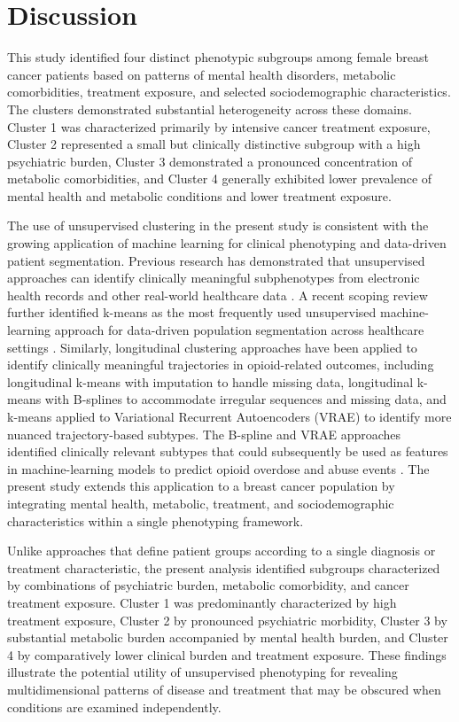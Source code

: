 \documentclass[11pt]{article}
\begin{document}
\section{Discussion}
This study identified four distinct phenotypic subgroups among female breast cancer patients based on patterns of mental health disorders, metabolic comorbidities, treatment exposure, and selected sociodemographic characteristics. The clusters demonstrated substantial heterogeneity across these domains. Cluster 1 was characterized primarily by intensive cancer treatment exposure, Cluster 2 represented a small but clinically distinctive subgroup with a high psychiatric burden, Cluster 3 demonstrated a pronounced concentration of metabolic comorbidities, and Cluster 4 generally exhibited lower prevalence of mental health and metabolic conditions and lower treatment exposure.

The use of unsupervised clustering in the present study is consistent with the growing application of machine learning for clinical phenotyping and data-driven patient segmentation. Previous research has demonstrated that unsupervised approaches can identify clinically meaningful subphenotypes from electronic health records and other real-world healthcare data \cite{Yang2023}. A recent scoping review further identified k-means as the most frequently used unsupervised machine-learning approach for data-driven population segmentation across healthcare settings \cite{phenotypeclusteringhealthcare}. Similarly, longitudinal clustering approaches have been applied to identify clinically meaningful trajectories in opioid-related outcomes, including longitudinal k-means with imputation to handle missing data, longitudinal k-means with B-splines to accommodate irregular sequences and missing data, and k-means applied to Variational Recurrent Autoencoders (VRAE) to identify more nuanced trajectory-based subtypes. The B-spline and VRAE approaches identified clinically relevant subtypes that could subsequently be used as features in machine-learning models to predict opioid overdose and abuse events \cite{Mullin2021}. The present study extends this application to a breast cancer population by integrating mental health, metabolic, treatment, and sociodemographic characteristics within a single phenotyping framework.

Unlike approaches that define patient groups according to a single diagnosis or treatment characteristic, the present analysis identified subgroups characterized by combinations of psychiatric burden, metabolic comorbidity, and cancer treatment exposure. Cluster 1 was predominantly characterized by high treatment exposure, Cluster 2 by pronounced psychiatric morbidity, Cluster 3 by substantial metabolic burden accompanied by mental health burden, and Cluster 4 by comparatively lower clinical burden and treatment exposure. These findings illustrate the potential utility of unsupervised phenotyping for revealing multidimensional patterns of disease and treatment that may be obscured when conditions are examined independently.
\end{document}
